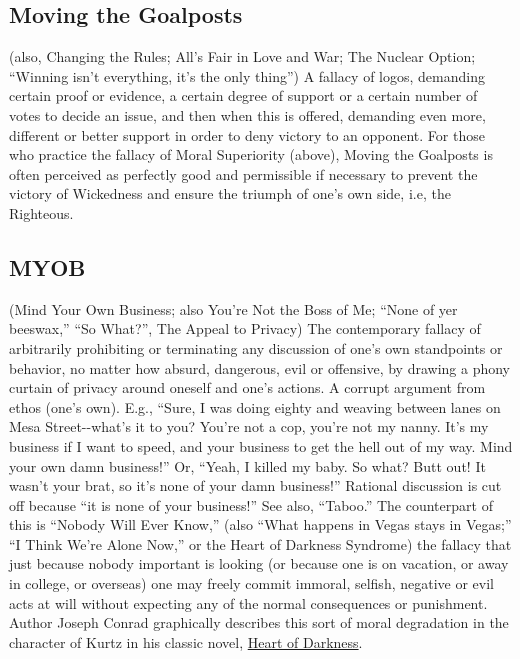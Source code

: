 \documentclass[10pt,a4paper,british]{article}
\begin{document}
\begin{multicols}{2}
	\subsection{Moving the Goalposts} (also, Changing the Rules; All's Fair in Love and War; The Nuclear Option; ``Winning isn't everything, it's the only thing'') A fallacy of logos, demanding certain proof or evidence, a certain degree of support or a certain number of votes to decide an issue, and then when this is offered, demanding even more, different or better support in order to deny victory to an opponent. For those who practice the fallacy of Moral Superiority (above), Moving the Goalposts is often perceived as perfectly good and permissible if necessary to prevent the victory of Wickedness and ensure the triumph of one's own side, i.e, the Righteous.  

	\subsection{MYOB} (Mind Your Own Business;  also You're Not the Boss of Me; ``None of yer beeswax,'' ``So What?'', The Appeal to Privacy) The contemporary fallacy of arbitrarily prohibiting or terminating any discussion of one's own standpoints or behavior, no matter how absurd, dangerous, evil or offensive, by drawing a phony curtain of privacy around oneself and one's actions. A corrupt argument from ethos (one's own). E.g., ``Sure, I was doing eighty and weaving between lanes on Mesa Street{-}{-}what's it to you? You're not a cop, you're not my nanny. It's my business if I want to speed, and your business to get the hell out of my way. Mind your own damn business!'' Or, ``Yeah, I killed my baby. So what?  Butt out! It wasn't your brat, so it's none of your damn business!'' Rational discussion is cut off because ``it is none of your business!'' See also, ``Taboo.'' The counterpart of this is ``Nobody Will Ever Know,'' (also ``What happens in Vegas stays in Vegas;'' ``I Think We're Alone Now,'' or the Heart of Darkness Syndrome) the fallacy that just because nobody important is looking (or because one is on vacation, or away in college, or overseas) one may freely commit immoral, selfish, negative or evil acts at will without expecting any of the normal consequences or punishment. Author Joseph Conrad graphically describes this sort of moral degradation in the character of Kurtz in his classic novel, \href{https://www.amazon.com/Heart-Darkness-Joseph-Conrad/dp/1503275922}{Heart of Darkness}.  


\end{multicols}
\end{document}
